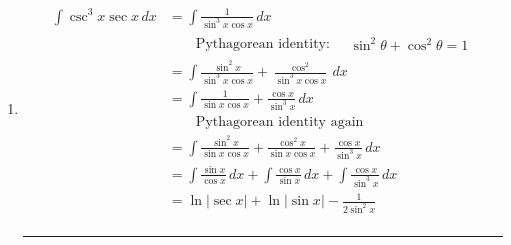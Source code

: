 \begin{enumerate}
    \paragraph{}

  \item
    \begin{equation}
      \begin{aligned}
        \int \csc^3 x \sec x \, dx
        & = \int \frac{1}{\sin^3 x \cos x} \, dx \\
        & \qquad
          \text{Pythagorean identity:}
          \quad
          \boxed{
            \begin{aligned}
              \sin^2 \theta + \cos^2 \theta = 1
            \end{aligned}
          } \\
        & = \int \frac{\sin^2 x}{\sin^3 x \cos x} + \frac{\cos^2}{\sin^3 x \cos x} \, dx \\
        & = \int \frac{1}{\sin x \cos x} + \frac{\cos x}{\sin^3 x} \, dx \\
        &  \qquad \text{Pythagorean identity again} \\
        & = \int \frac{\sin^2 x}{\sin x \cos x}+ \frac{\cos^2 x}{\sin x \cos x} + \frac{\cos x}{\sin^3 x} \, dx \\
        & = \int \frac{\sin x}{\cos x} \, dx + \int \frac{\cos x}{\sin x} \, dx + \int \frac{\cos x}{\sin^3 x} \, dx \\
        & = \ln | \sec x | + \ln | \sin x | - \frac{1}{2 \sin^2 x}
      \end{aligned}
    \end{equation}
    \paragraph{}
    \hrule
    \paragraph{}
\end{enumerate}